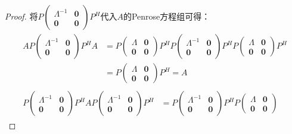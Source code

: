 \begin{proof}
	将$P
	\begin{pmatrix}
		\varLambda^{-1} & \mathbf{0} \\
		\mathbf{0} & \mathbf{0}
	\end{pmatrix}P^H$代入$A$的Penrose方程组可得：
	\begin{gather*}
		\begin{aligned}
			AP
			\begin{pmatrix}
				\varLambda^{-1} & \mathbf{0} \\
				\mathbf{0} & \mathbf{0}
			\end{pmatrix}P^HA
			&=P
			\begin{pmatrix}
				\varLambda & \mathbf{0} \\
				\mathbf{0} & \mathbf{0}
			\end{pmatrix}
			P^HP
			\begin{pmatrix}
				\varLambda^{-1} & \mathbf{0} \\
				\mathbf{0} & \mathbf{0}
			\end{pmatrix}
			P^HP
			\begin{pmatrix}
				\varLambda & \mathbf{0} \\
				\mathbf{0} & \mathbf{0}
			\end{pmatrix}
			P^H \\
			&=P
			\begin{pmatrix}
				\varLambda & \mathbf{0} \\
				\mathbf{0} & \mathbf{0}
			\end{pmatrix}
			P^H
			=A
		\end{aligned} \\
		\begin{aligned}
			P
			\begin{pmatrix}
				\varLambda^{-1} & \mathbf{0} \\
				\mathbf{0} & \mathbf{0}
			\end{pmatrix}
			P^HAP
			\begin{pmatrix}
				\varLambda^{-1} & \mathbf{0} \\
				\mathbf{0} & \mathbf{0}
			\end{pmatrix}
			P^H
			&=P
			\begin{pmatrix}
				\varLambda^{-1} & \mathbf{0} \\
				\mathbf{0} & \mathbf{0}
			\end{pmatrix}
			P^HP
			\begin{pmatrix}
				\varLambda & \mathbf{0} \\
				\mathbf{0} & \mathbf{0}
			\end{pmatrix}

\end{aligned}
\end{gather*}
\end{proof}
